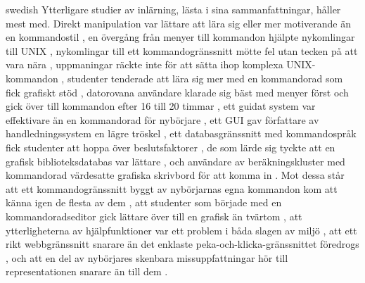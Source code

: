 \begin{onlyin}{swedish}
Ytterligare studier av inlärning, lästa i sina sammanfattningar, håller
mest med.  Direkt manipulation var lättare att lära sig eller mer
motiverande än en kommandostil
\autocite{Davis1994Effects,Davis2001Mediating,Davis1998Effect,%
Wiedenbeck1997Influence}, en övergång från menyer till kommandon
hjälpte nykomlingar till UNIX \autocite{Badre1991Effects}, nykomlingar
till ett kommandogränssnitt mötte fel utan tecken på att vara nära
\autocite{Lewis2003Menus}, uppmaningar räckte inte för att sätta ihop
komplexa UNIX-kommandon \autocite{Doane1992Prompt}, studenter tenderade
att lära sig mer med en kommandorad som fick grafiskt stöd
\autocite{Herrera2005Training}, datorovana användare klarade sig bäst
med menyer först och gick över till kommandon efter 16 till 20 timmar
\autocite{Gilfoil1982Warming}, ett guidat system var effektivare än en
kommandorad för nybörjare \autocite{Westendorp1997Guided}, ett GUI gav
författare av handledningssystem en lägre tröskel
\autocite{Devasani2012Evaluation}, ett databasgränssnitt med
kommandospråk fick studenter att hoppa över beslutsfaktorer
\autocite{Chen2001Investigation}, de som lärde sig tyckte att en
grafisk biblioteksdatabas var lättare \autocite{Gaff1994Gui}, och
användare av beräkningskluster med kommandorad värdesatte grafiska
skrivbord för att komma in \autocite{Thota2019Desktops}.  Mot dessa står
att ett kommandogränssnitt byggt av nybörjarnas egna kommandon kom att
känna igen de flesta av dem \autocite{Good1984Building}, att studenter
som började med en kommandoradseditor gick lättare över till en grafisk
än tvärtom \autocite{Dillon2012Mental}, att ytterligheterna av
hjälpfunktioner var ett problem i båda slagen av miljö
\autocite{Dillon2012Comparing}, att ett rikt webbgränssnitt snarare än
det enklaste peka-och-klicka-gränssnittet föredrogs
\autocite{MarquezBarja2018Assessing}, och att en del av nybörjares
skenbara missuppfattningar hör till representationen snarare än till dem
\autocite{Masson1988Misconceived}.
\end{onlyin}

\section{} %
\label{sec:cli-efficiency-discussion}

